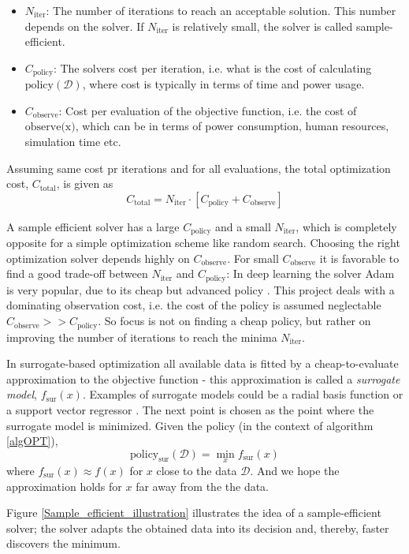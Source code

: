 \begin{itemize}[noitemsep]
    \item $N_{\text{iter}}$: The number of iterations to reach an acceptable solution. This number depends on the
    solver. If $N_{\text{iter}}$ is relatively small, the solver is called sample-efficient. 
    \item $C_{\text{policy}}$: The solvers cost per iteration, i.e. what is the cost of calculating
    $\text{policy}(\mathcal{D})$, where cost is typically in terms of time and power usage. 
    \item $C_{\text{observe}}$: Cost per evaluation of the objective function, i.e. the cost of $\text{observe(x)}$,
    which can be in terms of power consumption, human resources, simulation time etc.
\end{itemize}
Assuming same cost pr iterations and for all evaluations, the total optimization cost, $C_{\text{total}}$, is given as 
$$C_{\text{total}} = N_{\text{iter}} \cdot \left[ C_{\text{policy}} + C_{\text{observe}}\right]$$

A sample efficient solver has a large $C_{\text{policy}}$ and a small $N_{\text{iter}}$, which is
completely opposite for a simple optimization scheme like random search. Choosing the right
optimization solver depends highly on $C_{\text{observe}}$. For small $C_{\text{observe}}$ it is
favorable to find a good trade-off between $N_{\text{iter}}$ and $C_{\text{policy}}$: In deep
learning the solver Adam is very popular, due to its cheap but advanced policy \cite{Adam}. This
project deals with a dominating observation cost, i.e. the cost of the policy is assumed neglectable
$C_{\text{observe}}>>C_{\text{policy}}$. So focus is not on finding a cheap policy, but rather on
improving the number of iterations to reach the minima $N_{\text{iter}}$.

\begin{testexample}[Surrogate-based optimization]
    In surrogate-based optimization all available data is fitted by a cheap-to-evaluate
    approximation to the objective function - this approximation is called a \textit{surrogate
    model}, $f_{\text{sur}}(x)$. Examples of surrogate models could be a radial basis function or a
    support vector regressor \cite{deterministicsurrogatemodels}. The next point is chosen as the point where the surrogate model is
    minimized. Given the policy (in the context of algorithm \ref{algOPT}),
    $$\text{policy}_{\text{sur}}(\mathcal{D}) = \min_x f_{\text{sur}}(x)$$
    where $f_{\text{sur}}(x) \approx f(x)$ for $x$ close to the data $\mathcal{D}$. And we hope the approximation
    holds for $x$ far away from the the data.
\end{testexample}
Figure \ref{Sample_efficient_illustration} illustrates the idea of a sample-efficient solver; the solver adapts
the obtained data into its decision and, thereby, faster discovers the minimum. 

